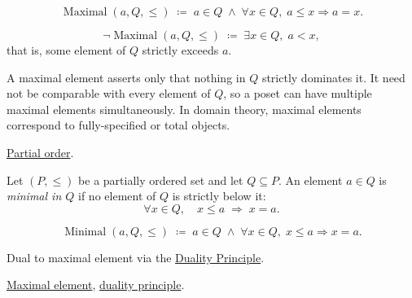 \begin{remark*}
\[
\operatorname{Maximal}(a, Q, \leq)
\;\coloneqq\;
a \in Q \;\land\; \forall x \in Q,\; a \leq x \Rightarrow a = x.
\]
\end{remark*}

\begin{remark*}
\[
\neg\operatorname{Maximal}(a, Q, \leq)
\;\coloneqq\;
\exists x \in Q,\; a < x,
\]
that is, some element of $Q$ strictly exceeds $a$.
\end{remark*}

\begin{remark*}[Interpretation]
A maximal element asserts only that nothing in $Q$ strictly dominates it.
It need not be comparable with every element of $Q$, so a poset can have
multiple maximal elements simultaneously.  In domain theory, maximal
elements correspond to fully-specified or total objects.
\end{remark*}

\begin{remark*}[Dependencies]
\hyperref[def:lattice-order-partial-order]{Partial order}.
\end{remark*}


\begin{definition}
\label{def:minimal-element}
Let $(P, \leq)$ be a partially ordered set and let $Q \subseteq P$.  An
element $a \in Q$ is \emph{minimal in $Q$} if no element of $Q$ is
strictly below it:
\[
\forall x \in Q, \quad x \leq a \;\Longrightarrow\; x = a.
\]
\end{definition}

\begin{remark*}
\[
\operatorname{Minimal}(a, Q, \leq)
\;\coloneqq\;
a \in Q \;\land\; \forall x \in Q,\; x \leq a \Rightarrow x = a.
\]
\end{remark*}

\begin{remark*}[Interpretation]
Dual to maximal element via the
\hyperref[prop:duality-principle]{Duality Principle}.
\end{remark*}

\begin{remark*}[Dependencies]
\hyperref[def:maximal-element]{Maximal element},
\hyperref[prop:duality-principle]{duality principle}.
\end{remark*}

